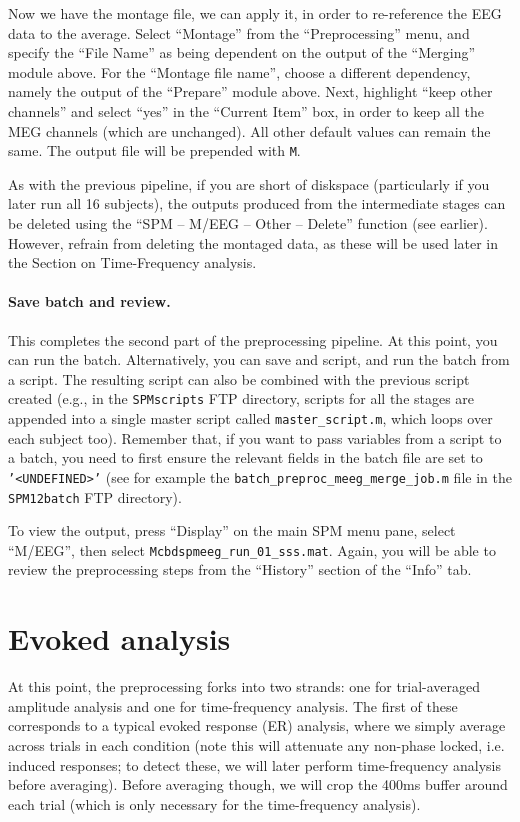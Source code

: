 Now we have the montage file, we can apply it, in order to re-reference the EEG data to the average. Select ``Montage'' from the ``Preprocessing'' menu, and specify the ``File Name'' as being dependent on the output of the ``Merging'' module above. For the ``Montage file name'', choose a different dependency, namely the output of the ``Prepare'' module above. Next, highlight ``keep other channels'' and select ``yes'' in the ``Current Item'' box, in order to keep all the MEG channels (which are unchanged). All other default values can remain the same. The output file will be prepended with \texttt{M}.

As with the previous pipeline, if you are short of diskspace (particularly if you later run all 16 subjects), the outputs produced from the intermediate stages can be deleted using the ``SPM -- M/EEG -- Other -- Delete'' function (see earlier). However, refrain from deleting the montaged data, as these will be used later in the Section on Time-Frequency analysis.

\paragraph{Save batch and review.}

This completes the second part of the preprocessing pipeline. At this point, you can run the batch. Alternatively, you can save and script, and run the batch from a script. The resulting script can also be combined with the previous script created (e.g., in the \texttt{SPMscripts} FTP directory, scripts for all the stages are appended into a single master script called \texttt{master\_script.m}, which loops over each subject too). Remember that, if you want to pass variables from a script to a batch, you need to first ensure the relevant fields in the batch file are set to \texttt{'<UNDEFINED>'} (see for example the \texttt{batch\_preproc\_meeg\_merge\_job.m} file in the \texttt{SPM12batch} FTP directory).
 
To view the output, press ``Display'' on the main SPM menu pane, select ``M/EEG'', then select \texttt{Mcbdspmeeg\_run\_01\_sss.mat}. Again, you will be able to review the preprocessing steps from the ``History'' section of the ``Info'' tab. 

\section{Evoked analysis}

At this point, the preprocessing forks into two strands: one for trial-averaged amplitude analysis and one for time-frequency analysis. The first of these corresponds to a typical evoked response (ER) analysis, where we simply average across trials in each condition (note this will attenuate any non-phase locked, i.e. induced responses; to detect these, we will later perform time-frequency analysis before averaging). Before averaging though, we will crop the 400ms buffer around each trial (which is only necessary for the time-frequency analysis).

